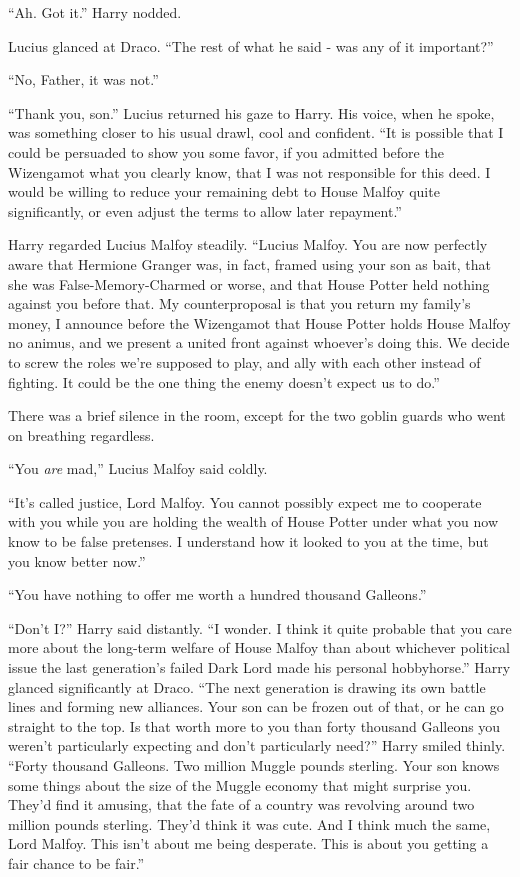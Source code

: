 ``Ah. Got it.'' Harry nodded.

Lucius glanced at Draco. ``The rest of what he said - was any of it
important?''

``No, Father, it was not.''

``Thank you, son.'' Lucius returned his gaze to Harry. His voice, when
he spoke, was something closer to his usual drawl, cool and confident.
``It is possible that I could be persuaded to show you some favor, if
you admitted before the Wizengamot what you clearly know, that I was not
responsible for this deed. I would be willing to reduce your remaining
debt to House Malfoy quite significantly, or even adjust the terms to
allow later repayment.''

Harry regarded Lucius Malfoy steadily. ``Lucius Malfoy. You are now
perfectly aware that Hermione Granger was, in fact, framed using your
son as bait, that she was False-Memory-Charmed or worse, and that House
Potter held nothing against you before that. My counterproposal is that
you return my family's money, I announce before the Wizengamot that
House Potter holds House Malfoy no animus, and we present a united front
against whoever's doing this. We decide to screw the roles we're
supposed to play, and ally with each other instead of fighting. It could
be the one thing the enemy doesn't expect us to do.''

There was a brief silence in the room, except for the two goblin guards
who went on breathing regardless.

``You \emph{are} mad,'' Lucius Malfoy said coldly.

``It's called justice, Lord Malfoy. You cannot possibly expect me to
cooperate with you while you are holding the wealth of House Potter
under what you now know to be false pretenses. I understand how it
looked to you at the time, but you know better now.''

``You have nothing to offer me worth a hundred thousand Galleons.''

``Don't I?'' Harry said distantly. ``I wonder. I think it quite probable
that you care more about the long-term welfare of House Malfoy than
about whichever political issue the last generation's failed Dark Lord
made his personal hobbyhorse.'' Harry glanced significantly at Draco.
``The next generation is drawing its own battle lines and forming new
alliances. Your son can be frozen out of that, or he can go straight to
the top. Is that worth more to you than forty thousand Galleons you
weren't particularly expecting and don't particularly need?'' Harry
smiled thinly. ``Forty thousand Galleons. Two million Muggle pounds
sterling. Your son knows some things about the size of the Muggle
economy that might surprise you. They'd find it amusing, that the fate
of a country was revolving around two million pounds sterling. They'd
think it was cute. And I think much the same, Lord Malfoy. This isn't
about me being desperate. This is about you getting a fair chance to be
fair.''

